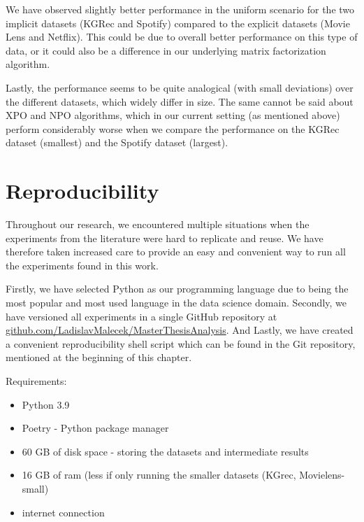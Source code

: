 We have observed slightly better performance in the uniform scenario for the two implicit datasets (KGRec and Spotify) compared to the explicit datasets (Movie Lens and Netflix). This could be due to overall better performance on this type of data, or it could also be a difference in our underlying matrix factorization algorithm.

Lastly, the performance seems to be quite analogical (with small deviations) over the different datasets, which widely differ in size. The same cannot be said about XPO and NPO algorithms, which in our current setting (as mentioned above) perform considerably worse when we compare the performance on the KGRec dataset (smallest) and the Spotify dataset (largest).


\section{Reproducibility}

Throughout our research, we encountered multiple situations when the experiments from the literature were hard to replicate and reuse. We have therefore taken increased care to provide an easy and convenient way to run all the experiments found in this work.

Firstly, we have selected Python as our programming language due to being the most popular and most used language in the data science domain.
Secondly, we have versioned all experiments in a single GitHub repository at \newline\href{https://github.com/LadislavMalecek/MasterThesisAnalysis}{github.com/LadislavMalecek/MasterThesisAnalysis}. And Lastly, we have created a convenient reproducibility shell script  which can be found in the Git repository, mentioned at the beginning of this chapter.

Requirements:
\begin{itemize}
    \item Python 3.9
    \item Poetry - Python package manager
    \item 60 GB of disk space - storing the datasets and intermediate results
    \item 16 GB of ram (less if only running the smaller datasets (KGrec, Movielens-small)
    \item internet connection
\end{itemize}


